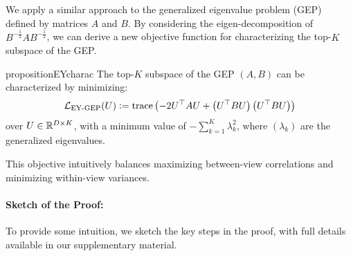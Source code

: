 We apply a similar approach to the generalized eigenvalue problem (GEP) defined by matrices \(A\) and \(B\). By considering the eigen-decomposition of \(B^{-\frac{1}{2}} A B^{-\frac{1}{2}}\), we can derive a new objective function for characterizing the top-$K$ subspace of the GEP.

\begin{restatable}{proposition}{EYcharac}
    \label{prop:EY-charac}
    The top-$K$ subspace of the GEP $(A,B)$ can be characterized by minimizing:
    \begin{align}\label{eq:EY-charac}
    \mathcal{L}_\text{EY-GEP}(U) \vcentcolon= \operatorname{trace} \left( - 2U^\top A U + \left(U^\top B U\right) \left(U^\top B U\right) \right)
    \end{align}
    over $U \in \mathbb{R}^{D \times K}$, with a minimum value of $- \sum_{k=1}^K \lambda_k^2$, where $(\lambda_k)$ are the generalized eigenvalues.
\end{restatable}
    
This objective intuitively balances maximizing between-view correlations and minimizing within-view variances.

\paragraph{Sketch of the Proof:}
To provide some intuition, we sketch the key steps in the proof, with full details available in our supplementary material.

